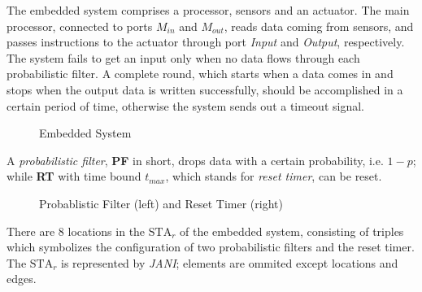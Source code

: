 \documentclass{llncs}
\newcommand{\nSTA}{\mbox{STA}_r}
\begin{document}
\begin{example}
The embedded system comprises a processor, sensors and an actuator.
The main processor, connected to ports \emph{$M_{in}$} and \emph{$M_{out}$},
reads data coming from sensors, and passes instructions to the actuator
through port \emph{Input} and \emph{Output}, respectively.
The system fails to get an input only when no data flows
    through each probabilistic filter.
A complete round, which starts when a data comes in
and stops when the output data is written successfully,
should be accomplished in a certain period of time,
otherwise the system sends out a timeout signal.

\begin{figure}[H]
    \centering
    
    \caption{Embedded System}
    \label{fig:em}
\end{figure}

A \emph{probabilistic filter}, \textbf{PF} in short,
    drops data with a certain probability, i.e. $1 - p$; while
\textbf{RT} with time bound $t_{max}$,
which stands for \emph{reset timer}, can be reset.

\begin{figure}[H]
    \centering
    
    \caption{Probablistic Filter (left) and Reset Timer (right)}
    \label{fig:em}
\end{figure}

There are 8 locations in the $\nSTA$ of the embedded system,
consisting of triples which symbolizes the configuration of
    two probabilistic filters and the reset timer.
The $\nSTA$ is represented by \emph{JANI};
elements are ommited except locations and edges.



\end{example}
\end{document}
